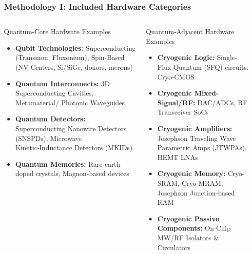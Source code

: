 \documentclass[aspectratio=169]{beamer}
\begin{document}
\begin{frame}
    \frametitle{Methodology I: Included Hardware Categories}
    \begin{columns}[T]
        \begin{column}{0.5\textwidth}
            \begin{block}{Quantum-Core Hardware Examples}
                \begin{itemize}
                    \item \textbf{Qubit Technologies:} Superconducting (Transmon, Fluxonium), Spin-Based (NV Centers, Si/SiGe, donors, merons)
                    \item \textbf{Quantum Interconnects:} 3D Superconducting Cavities, Metamaterial/ Photonic Waveguides
                    \item \textbf{Quantum Detectors:} Superconducting Nanowire Detectors (SNSPDs), Microwave Kinetic‑Inductance Detectors (MKIDs)
                    \item \textbf{Quantum Memories:} Rare-earth doped crystals, Magnon-based devices
                \end{itemize}
            \end{block}
        \end{column}
        \begin{column}{0.5\textwidth}
            \begin{block}{Quantum-Adjacent Hardware Examples}
                \begin{itemize}
                    \item \textbf{Cryogenic Logic:} Single-Flux-Quantum (SFQ) circuits, Cryo-CMOS
                    \item \textbf{Cryogenic Mixed-Signal/RF:} DAC/ADCs, \break RF Transceiver SoCs
                    \item \textbf{Cryogenic Amplifiers:} Josephson Traveling Wave Parametric Amps (JTWPAs), HEMT LNAs
                    \item \textbf{Cryogenic Memory:} Cryo-SRAM, Cryo-MRAM, Josephson Junction-based RAM
                    \item \textbf{Cryogenic Passive Components:} On-Chip MW/RF Isolators \& Circulators
                \end{itemize}
            \end{block}
        \end{column}
    \end{columns}
\end{frame}
\end{document}

